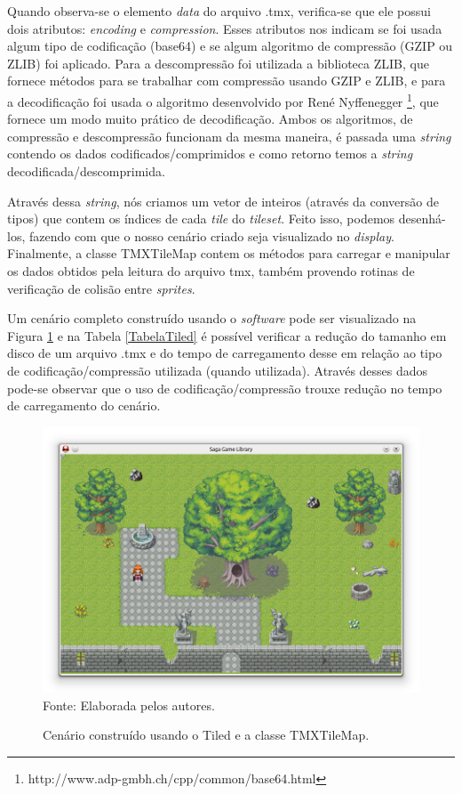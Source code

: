 %
\par 
Quando observa-se o elemento \textit{data} do arquivo .tmx, verifica-se que ele possui dois atributos: \textit{encoding} e \textit{compression}. Esses atributos nos indicam se foi usada algum tipo de codificação (base64) e se algum algoritmo de compressão (GZIP ou ZLIB) foi aplicado. Para a descompressão foi utilizada a biblioteca ZLIB, que fornece métodos para se trabalhar com compressão usando GZIP e ZLIB, e para a decodificação foi usada o algoritmo desenvolvido por René Nyffenegger \footnote{http://www.adp-gmbh.ch/cpp/common/base64.html}, que fornece um modo muito prático de decodificação. Ambos os algoritmos, de compressão e descompressão funcionam da mesma maneira, é passada uma \textit{string} contendo os dados codificados/comprimidos e como retorno temos a \textit{string} decodificada/descomprimida. 
\par
Através dessa \textit{string}, nós criamos um vetor de inteiros (através da conversão de tipos) que contem os índices de cada \textit{tile} do \textit{tileset}. Feito isso, podemos desenhá-los, fazendo com que o nosso cenário criado seja visualizado no \textit{display}. Finalmente, a classe TMXTileMap contem os métodos para carregar e manipular os dados obtidos pela leitura do arquivo tmx, também provendo rotinas de verificação de colisão entre \textit{sprites}.
\par
Um cenário completo construído usando o \textit{software} pode ser visualizado na Figura \ref{snapshot1} e na Tabela \ref{TabelaTiled} é possível verificar a redução do tamanho em disco de um arquivo .tmx e do tempo de carregamento desse em relação ao tipo de codificação/compressão utilizada (quando utilizada). Através desses dados pode-se observar que o uso de codificação/compressão trouxe redução no tempo de carregamento do cenário.
%
%
\begin{figure}[ht]
    \centering
    \caption{Cenário construído usando o Tiled e a classe TMXTileMap.}
    \label{snapshot1}
    \includegraphics[scale = 0.60]{Imagens/snapshot1.png}
    \\Fonte: Elaborada pelos autores.
\end{figure}
